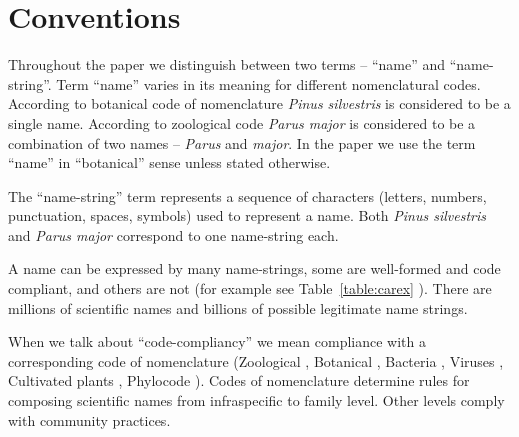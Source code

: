 \documentclass{bmcart}
\begin{document}


\section*{Conventions}

Throughout the paper we distinguish between two terms -- ``name'' and
``name-string''. Term ``name'' varies in its meaning for different
nomenclatural codes. According to botanical code of nomenclature \cite{ICN}
\textit{Pinus silvestris} is considered to be a single name. According to
zoological code \cite{ICZN} \textit{Parus major} is considered to be a
combination of two names -- \textit{Parus} and \textit{major}. In the paper we
use the term ``name'' in ``botanical'' sense unless stated otherwise.

The ``name-string'' term represents a sequence of characters (letters, numbers,
punctuation, spaces, symbols) used to represent a name. Both \textit{Pinus
silvestris} and \textit{Parus major} correspond to one name-string each.

A name can be expressed by many name-strings, some are well-formed and code
compliant, and others are not (for example see Table~\ref{table:carex} ). There
are millions of scientific names and billions of possible legitimate name
strings.

When we talk about ``code-compliancy'' we mean compliance with a corresponding
code of nomenclature (Zoological \cite{ICZN}, Botanical \cite{ICN},
Bacteria \cite{ICNB}, Viruses \cite{ICTV}, Cultivated plants \cite{ICNCP},
Phylocode \cite{ICPN}). Codes of nomenclature determine rules for composing
scientific names from infraspecific to family level. Other levels comply with
community practices.
\end{document}
